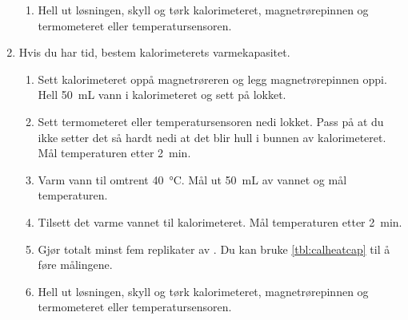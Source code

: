 \begin{enumerate}
\begin{enumerate}
			\item Hell ut løsningen, skyll og tørk kalorimeteret, magnetrørepinnen og termometeret eller temperatursensoren.
		\end{enumerate}	
	
		\item Hvis du har tid, bestem kalorimeterets varmekapasitet.
		\begin{enumerate}
			\item Sett kalorimeteret oppå magnetrøreren og legg magnetrørepinnen oppi.
			Hell \SI{50}{\milli\liter} vann i kalorimeteret og sett på lokket. \label{lst:firststep2}
			
			\item Sett termometeret eller temperatursensoren nedi lokket. Pass på at du ikke setter det så hardt nedi at det blir hull i bunnen av kalorimeteret.
			Mål temperaturen etter \SI{2}{\minute}.
			
			\item Varm vann til omtrent \SI{40}{\degreeCelsius}.
			Mål ut \SI{50}{\milli\liter} av vannet og mål temperaturen.
			
			\item Tilsett det varme vannet til kalorimeteret.
			Mål temperaturen etter \SI{2}{\minute}. \label{lst:fourthstep2}
			
			\item Gjør totalt minst fem replikater av .
			Du kan bruke \cref{tbl:calheatcap} til å føre målingene.
			
			\item Hell ut løsningen, skyll og tørk kalorimeteret, magnetrørepinnen og termometeret eller temperatursensoren.
		\end{enumerate}
	\end{enumerate}

